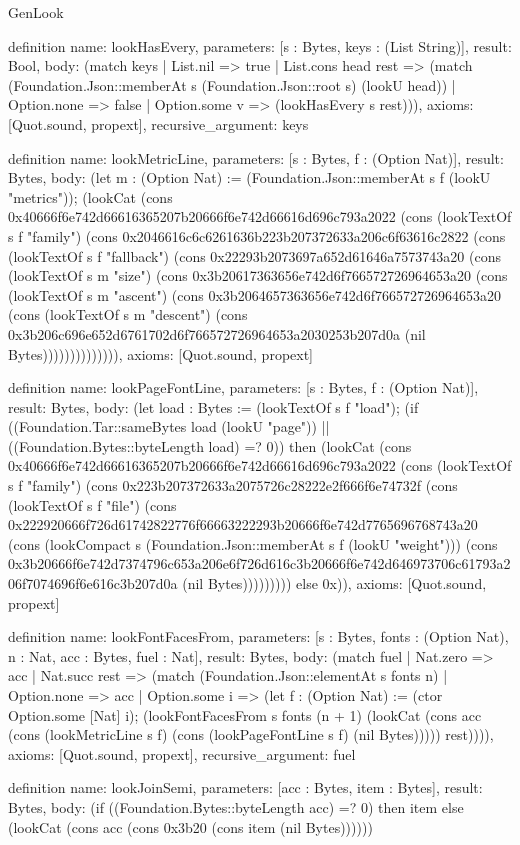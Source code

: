 \begin{lexlean}{GenLook}
\begin{semanticmodule}
definition{
  name: lookHasEvery,
  parameters: [s : Bytes, keys : (List String)],
  result: Bool,
  body: (match keys
    | List.nil => true
    | List.cons head rest => (match (Foundation.Json::memberAt s (Foundation.Json::root s) (lookU head))
      | Option.none => false
      | Option.some v => (lookHasEvery s rest))),
  axioms: [Quot.sound, propext],
  recursive_argument: keys
}

definition{
  name: lookMetricLine,
  parameters: [s : Bytes, f : (Option Nat)],
  result: Bytes,
  body: (let m : (Option Nat) := (Foundation.Json::memberAt s f (lookU "metrics")); (lookCat (cons 0x40666f6e742d66616365207b20666f6e742d66616d696c793a2022 (cons (lookTextOf s f "family") (cons 0x2046616c6c6261636b223b207372633a206c6f63616c2822 (cons (lookTextOf s f "fallback") (cons 0x22293b2073697a652d61646a7573743a20 (cons (lookTextOf s m "size") (cons 0x3b20617363656e742d6f766572726964653a20 (cons (lookTextOf s m "ascent") (cons 0x3b2064657363656e742d6f766572726964653a20 (cons (lookTextOf s m "descent") (cons 0x3b206c696e652d6761702d6f766572726964653a2030253b207d0a (nil Bytes)))))))))))))),
  axioms: [Quot.sound, propext]
}

definition{
  name: lookPageFontLine,
  parameters: [s : Bytes, f : (Option Nat)],
  result: Bytes,
  body: (let load : Bytes := (lookTextOf s f "load"); (if ((Foundation.Tar::sameBytes load (lookU "page")) || ((Foundation.Bytes::byteLength load) =? 0)) then (lookCat (cons 0x40666f6e742d66616365207b20666f6e742d66616d696c793a2022 (cons (lookTextOf s f "family") (cons 0x223b207372633a2075726c28222e2f666f6e74732f (cons (lookTextOf s f "file") (cons 0x222920666f726d61742822776f66663222293b20666f6e742d7765696768743a20 (cons (lookCompact s (Foundation.Json::memberAt s f (lookU "weight"))) (cons 0x3b20666f6e742d7374796c653a206e6f726d616c3b20666f6e742d646973706c61793a206f7074696f6e616c3b207d0a (nil Bytes))))))))) else 0x)),
  axioms: [Quot.sound, propext]
}

definition{
  name: lookFontFacesFrom,
  parameters: [s : Bytes, fonts : (Option Nat), n : Nat, acc : Bytes, fuel : Nat],
  result: Bytes,
  body: (match fuel
    | Nat.zero => acc
    | Nat.succ rest => (match (Foundation.Json::elementAt s fonts n)
      | Option.none => acc
      | Option.some i => (let f : (Option Nat) := (ctor Option.some [Nat] i); (lookFontFacesFrom s fonts (n + 1) (lookCat (cons acc (cons (lookMetricLine s f) (cons (lookPageFontLine s f) (nil Bytes))))) rest)))),
  axioms: [Quot.sound, propext],
  recursive_argument: fuel
}

definition{
  name: lookJoinSemi,
  parameters: [acc : Bytes, item : Bytes],
  result: Bytes,
  body: (if ((Foundation.Bytes::byteLength acc) =? 0) then item else (lookCat (cons acc (cons 0x3b20 (cons item (nil Bytes))))))
}


\end{semanticmodule}
\end{lexlean}

